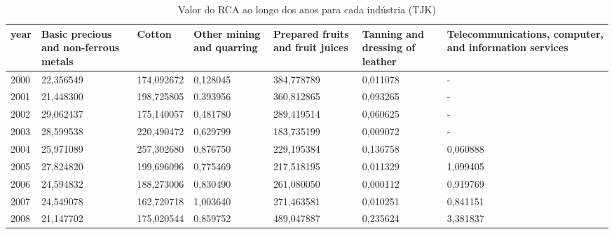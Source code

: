 \begin{table}
\centering
\caption{Valor do RCA ao longo dos anos para cada indústria (TJK)}
\begin{tabular}{p{1cm}p{2cm}p{2cm}p{2cm}p{2cm}p{2cm}p{2cm}}
\toprule
 year &  Basic precious and non-ferrous metals &     Cotton &  Other mining and quarring &  Prepared fruits and fruit juices &  Tanning and dressing of leather &  Telecommunications, computer, and information services \\
\midrule
 2000 &                              22,356549 & 174,092672 &                   0,128045 &                        384,778789 &                         0,011078 &                                                  - \\
 2001 &                              21,448300 & 198,725805 &                   0,393956 &                        360,812865 &                         0,093265 &                                                  - \\
 2002 &                              29,062437 & 175,140057 &                   0,481780 &                        289,419514 &                         0,060625 &                                                  - \\
 2003 &                              28,599538 & 220,490472 &                   0,629799 &                        183,735199 &                         0,009072 &                                                  - \\
 2004 &                              25,971089 & 257,302680 &                   0,876750 &                        229,195384 &                         0,136758 &                                           0,060888 \\
 2005 &                              27,824820 & 199,696096 &                   0,775469 &                        217,518195 &                         0,011329 &                                           1,099405 \\
 2006 &                              24,594832 & 188,273006 &                   0,830490 &                        261,080050 &                         0,000112 &                                           0,919769 \\
 2007 &                              24,549078 & 162,720718 &                   1,003640 &                        271,463581 &                         0,010251 &                                           0,841151 \\
 2008 &                              21,147702 & 175,020544 &                   0,859752 &                        489,047887 &                         0,235624 &                                           3,381837 \\

\end{tabular}
\end{table}

